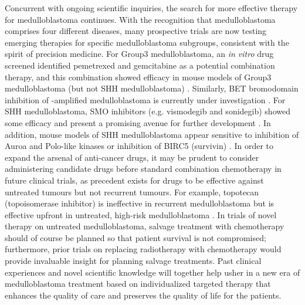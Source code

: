 Concurrent with ongoing scientific inquiries, the search for more effective therapy for medulloblastoma continues. With the recognition that medulloblastoma comprises four different diseases, many prospective trials are now testing emerging therapies for specific medulloblastoma subgroups, consistent with the spirit of precision medicine. For Group3 medulloblastoma, an \emph{in vitro} drug screened identified  pemetrexed and gemcitabine as a potential combination therapy, and this combination showed efficacy in mouse models of Group3 medulloblastoma (but not SHH medulloblastoma) . Similarly, BET bromodomain inhibition of -amplified medulloblastoma is currently under investigation . For SHH medulloblastoma, SMO inhibitors (e.g. vismodegib and sonidegib) showed some efficacy and present a promising avenue for further development . In addition, mouse models of SHH medulloblastoma appear sensitive to inhibition of Auroa and Polo-like kinases  or inhibition of BIRC5 (survivin) . In order to expand the arsenal of anti-cancer drugs, it may be prudent to consider administering candidate drugs before standard combination chemotherapy in future clinical trials, as precedent exists for drugs to be effective against untreated tumours but not recurrent tumours. For example, topotecan (topoisomerase inhibitor) is ineffective in recurrent medulloblastoma  but is effective upfront in untreated, high-risk medulloblastoma . In trials of novel therapy on untreated medulloblastoma, salvage treatment with chemotherapy should of course be planned so that patient survival is not compromised; furthermore, prior trials on replacing radiotherapy with chemotherapy would provide invaluable insight for planning salvage treatments. Past clinical experiences and novel scientific knowledge will together help usher in a new era of medulloblastoma treatment based on individualized targeted therapy that enhances the quality of care and preserves the quality of life for the patients.


